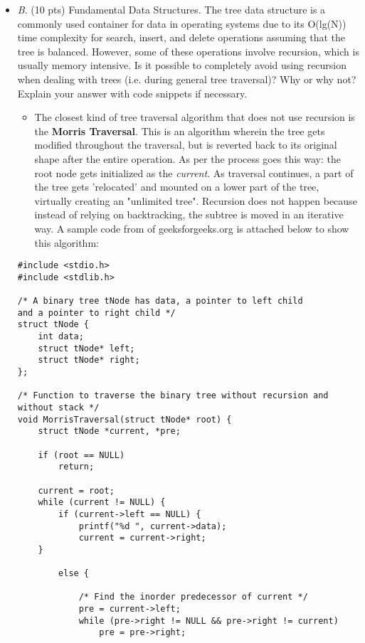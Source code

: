 \documentclass[conference]{IEEEtran}
\begin{document}
\begin{itemize}
	\item \textit{B}. (10 pts) Fundamental Data Structures. The tree data structure is a commonly used container
	for data in operating systems due to its O(lg(N)) time complexity for search, insert, and
	delete operations assuming that the tree is balanced. However, some of these operations
	involve recursion, which is usually memory intensive. Is it possible to completely avoid using
	recursion when dealing with trees (i.e. during general tree traversal)? Why or why not?
	Explain your answer with code snippets if necessary.
	\begin{itemize} 
		\item The closest kind of tree traversal algorithm that does not use recursion is the \textbf{Morris Traversal}. This is an algorithm wherein the tree gets modified throughout the traversal, but is reverted back to its original shape after the entire operation. As per \textcite{morrisstackoverflow} the process goes this way: the root node gets initialized as the \textit{current}. As traversal continues, a part of the tree gets 'relocated' and mounted on a lower part of the tree, virtually creating an "unlimited tree". Recursion does not happen because instead of relying on backtracking, the subtree is moved in an iterative way. A sample code from \textcite{morristraversal} of geeksforgeeks.org is attached below to show this algorithm:
	\end{itemize}
\begin{lstlisting}
#include <stdio.h> 
#include <stdlib.h> 

/* A binary tree tNode has data, a pointer to left child 
and a pointer to right child */
struct tNode { 
    int data; 
    struct tNode* left; 
    struct tNode* right; 
}; 

/* Function to traverse the binary tree without recursion and  
without stack */
void MorrisTraversal(struct tNode* root) { 
    struct tNode *current, *pre; 

    if (root == NULL) 
        return; 

    current = root; 
    while (current != NULL) { 
        if (current->left == NULL) { 
            printf("%d ", current->data); 
            current = current->right; 
    } 
		
        else { 

            /* Find the inorder predecessor of current */
            pre = current->left; 
            while (pre->right != NULL && pre->right != current) 
                pre = pre->right; 


\end{lstlisting}
\end{itemize}
\end{document}
